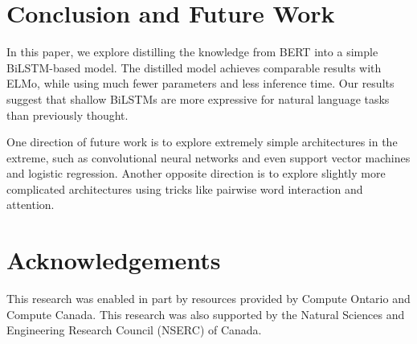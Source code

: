 \documentclass[11pt,a4paper]{article}
\begin{document}
\begin{table}[t]
\caption{Single-sentence model size and inference speed on SST-2. \# of Par. denotes number of millions of parameters, and inference time is in seconds.}
\label{tab: speed analysis}
\end{table}


\section{Conclusion and Future Work}
In this paper, we explore distilling the knowledge from BERT into a simple BiLSTM-based model.
The distilled model achieves comparable results with ELMo, while using much fewer parameters and less inference time.
Our results suggest that shallow BiLSTMs are more expressive for natural language tasks than previously thought.

One direction of future work is to explore extremely simple architectures in the extreme, such as convolutional neural networks and even support vector machines and logistic regression. Another opposite direction is to explore slightly more complicated architectures using tricks like pairwise word interaction and attention.


\section*{Acknowledgements}
This research was enabled in part by resources provided by Compute Ontario and Compute Canada. This research was also supported by the Natural Sciences and Engineering Research Council (NSERC) of Canada.
\end{document}
